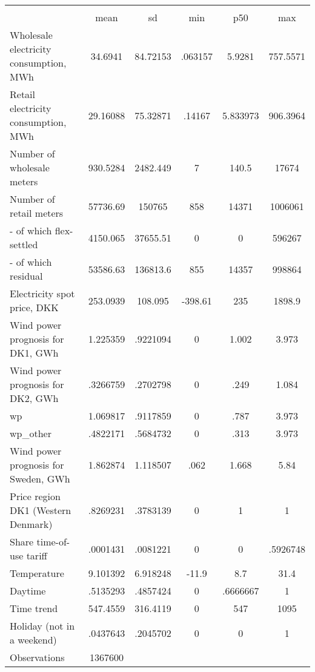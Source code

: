\begin{tabular}{l*{1}{ccccc}}
\hline\hline
                    &\multicolumn{5}{c}{}                                            \\
                    &        mean&          sd&         min&         p50&         max\\
\midrule
Wholesale electricity consumption, MWh&     34.6941&    84.72153&     .063157&      5.9281&    757.5571\\
Retail electricity consumption, MWh&    29.16088&    75.32871&      .14167&    5.833973&    906.3964\\
Number of wholesale meters&    930.5284&    2482.449&           7&       140.5&       17674\\
Number of retail meters&    57736.69&      150765&         858&       14371&     1006061\\
- of which flex-settled&    4150.065&    37655.51&           0&           0&      596267\\
- of which residual &    53586.63&    136813.6&         855&       14357&      998864\\
Electricity spot price, DKK&    253.0939&     108.095&     -398.61&         235&      1898.9\\
Wind power prognosis for DK1, GWh&    1.225359&    .9221094&           0&       1.002&       3.973\\
Wind power prognosis for DK2, GWh&    .3266759&    .2702798&           0&        .249&       1.084\\
wp                  &    1.069817&    .9117859&           0&        .787&       3.973\\
wp\_other            &    .4822171&    .5684732&           0&        .313&       3.973\\
Wind power prognosis for Sweden, GWh&    1.862874&    1.118507&        .062&       1.668&        5.84\\
Price region DK1 (Western Denmark)&    .8269231&    .3783139&           0&           1&           1\\
Share time-of-use tariff&    .0001431&    .0081221&           0&           0&    .5926748\\
Temperature         &    9.101392&    6.918248&       -11.9&         8.7&        31.4\\
Daytime             &    .5135293&    .4857424&           0&    .6666667&           1\\
Time trend          &    547.4559&    316.4119&           0&         547&        1095\\
Holiday (not in a weekend)&    .0437643&    .2045702&           0&           0&           1\\
\midrule
Observations        &     1367600&            &            &            &            \\
\bottomrule \end{tabular}
